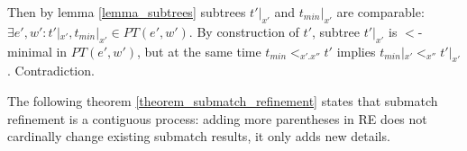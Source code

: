 \documentclass[AMA,STIX1COL]{WileyNJD-v2}
\newcommand{\PT}{PT}
\newcommand{\snorm}[2]{\|{#1}\|^{sub}_{#2}}
\begin{document}
\begin{proofEnd}
    Then by lemma \ref{lemma_subtrees} subtrees $t'|_{x'}$ and $t_{min}|_{x'}$ are comparable:
    $\exists e', w' : t'|_{x'}, t_{min}|_{x'} \in \PT(e', w')$.
    By construction of $t'$, subtree $t'|_{x'}$ is $<$-minimal in $\PT(e', w')$,
    but at the same time $t_{min} <_{x'.x''} t'$ implies $t_{min}|_{x'} <_{x''} t'|_{x'}$.
    Contradiction.
\end{proofEnd}

The following theorem \ref{theorem_submatch_refinement}
states that submatch refinement is a contiguous process:
adding more parentheses in RE does not cardinally change existing submatch results, it only adds new details.
\end{document}
